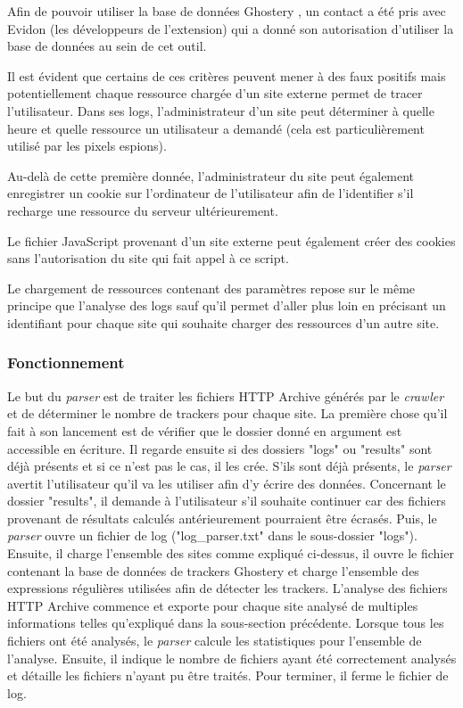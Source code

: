 Afin de pouvoir utiliser la base de données Ghostery \cite{ghostery_homepage}, un contact a été pris avec Evidon (les développeurs de l'extension) qui a donné son autorisation d'utiliser la base de données au sein de cet outil.
\newline

Il est évident que certains de ces critères peuvent mener à des faux positifs mais potentiellement chaque ressource chargée d'un site externe permet de tracer l'utilisateur. Dans ses logs, l'administrateur d'un site peut déterminer à quelle heure et quelle ressource un utilisateur a demandé (cela est particulièrement utilisé par les pixels espions).

Au-delà de cette première donnée, l'administrateur du site peut également enregistrer un cookie sur l'ordinateur de l'utilisateur afin de l'identifier s'il recharge une ressource du serveur ultérieurement.

Le fichier JavaScript provenant d'un site externe peut également créer des cookies sans l'autorisation du site qui fait appel à ce script.

Le chargement de ressources contenant des paramètres repose sur le même principe que l'analyse des logs sauf qu'il permet d'aller plus loin en précisant un identifiant pour chaque site qui souhaite charger des ressources d'un autre site.

\subsubsection{Fonctionnement}
Le but du \textit{parser} est de traiter les fichiers HTTP Archive générés par le \textit{crawler} et de déterminer le nombre de trackers pour chaque site. La première chose qu'il fait à son lancement est de vérifier que le dossier donné en argument est accessible en écriture. Il regarde ensuite si des dossiers "logs" ou "results" sont déjà présents et si ce n'est pas le cas, il les crée. S'ils sont déjà présents, le \textit{parser} avertit l'utilisateur qu'il va les utiliser afin d'y écrire des données. Concernant le dossier "results", il demande à l'utilisateur s'il souhaite continuer car des fichiers provenant de résultats calculés antérieurement pourraient être écrasés. Puis, le \textit{parser} ouvre un fichier de log ("log\_parser.txt" dans le sous-dossier "logs"). Ensuite, il charge l'ensemble des sites comme expliqué ci-dessus, il ouvre le fichier contenant la base de données de trackers Ghostery et charge l'ensemble des expressions régulières utilisées afin de détecter les trackers. L'analyse des fichiers HTTP Archive commence et exporte pour chaque site analysé de multiples informations telles qu'expliqué dans la sous-section précédente. Lorsque tous les fichiers ont été analysés, le \textit{parser} calcule les statistiques pour l'ensemble de l'analyse. Ensuite, il indique le nombre de fichiers ayant été correctement analysés et détaille les fichiers n'ayant pu être traités. Pour terminer, il ferme le fichier de log.

